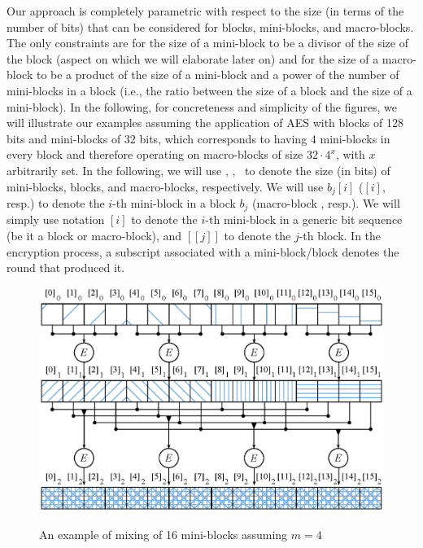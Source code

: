 Our approach is completely parametric with respect to the size (in terms of the number of bits) that can be considered for blocks, mini-blocks, and macro-blocks. The only constraints are for the size of a mini-block to be a divisor of the size of the block (aspect on which we will elaborate later on) and for the size of a macro-block to be a product of the size of a mini-block and a power of the number of mini-blocks in a block (i.e., the ratio between the size of a block and the size of a mini-block). In the following, for concreteness and simplicity of the figures, we will illustrate our examples assuming the application of AES with blocks of 128 bits and mini-blocks of 32 bits, which corresponds to having 4 mini-blocks in every block and therefore operating on macro-blocks of size $32 \cdot 4^x$, with $x$ arbitrarily set. In the following, we will use \msize, \bsize, \Msize\ to denote the size (in bits) of mini-blocks, blocks, and macro-blocks, respectively. We will use $b_j[i]$ ($[i]$, resp.) to denote the $i$-th mini-block in a block $b_j$ (macro-block , resp.). We will simply use notation $[i]$ to denote the $i$-th mini-block in a generic bit sequence (be it a block or macro-block), and $[[j]]$ to denote the $j$-th block. In the encryption process, a subscript associated with a mini-block/block denotes the round that produced it.

\begin{figure}[!t]
\includegraphics[width=\columnwidth]{chapters/ms/figures/fig01.eps}\\
\vspace*{-0.7cm}
\caption{\label{ms:fig:mixing} An example of mixing of 16 mini-blocks assuming $m=4$}
\end{figure}

